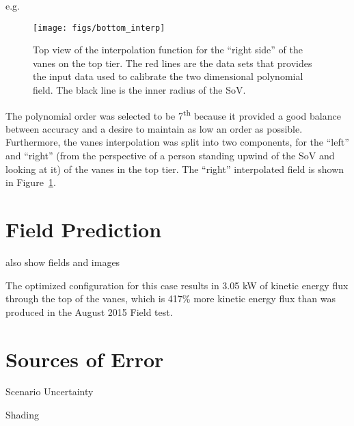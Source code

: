 %
%

e.g.

 \begin{figure}[!htb]
  \begin{center}
   \texttt{[image: figs/bottom\_interp]}
   \caption{Top view of the interpolation function for the ``right
   side'' of the vanes on the top tier. The red lines are the data sets
   that provides the input data used to calibrate the two dimensional
   polynomial field. The black line is the inner radius of the SoV.}
   \label{fig:bottom_interp}
  \end{center}
 \end{figure}

The polynomial order was selected to be 7\textsuperscript{th} because it
provided a good balance between accuracy and a desire to maintain as low
an order as possible. Furthermore, the vanes interpolation was split
into two components, for the ``left'' and ``right'' (from the perspective of a
person standing upwind of the SoV and looking at it) of the vanes in the
top tier. The ``right'' interpolated field is shown in
Figure~\ref{fig:bottom_interp}. 

%
%


\section{Field Prediction}
\label{subsec:field_predict}

also show fields and images

The optimized configuration for this case results in 3.05 kW of kinetic
energy flux through the top of the vanes, which is 417\% more kinetic
energy flux than was produced in the August 2015 Field test.


\section{Sources of Error}

%

Scenario Uncertainty

Shading

